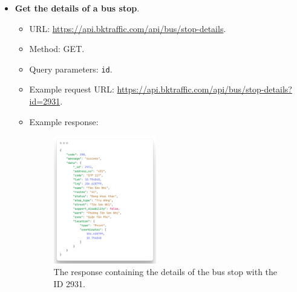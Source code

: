 \begin{itemize}
    \item \textbf{Get the details of a bus stop}.
    \begin{itemize}
        \item URL: \url{https://api.bktraffic.com/api/bus/stop-details}.
        \item Method: GET.
        \item Query parameters: \lstinline{id}.
        \item Example request URL: \url{https://api.bktraffic.com/api/bus/stop-details?id=2931}.
        \item Example response:
        \begin{figure}[H]
            \centering
            \includegraphics[width=0.45\textwidth]{assets/images/Implementation/stop_detail_response.png}
            \caption{The response containing the details of the bus stop with the ID 2931.}
            \label{fig:stop_detail_response}
        \end{figure}
    \end{itemize}


\end{itemize}
